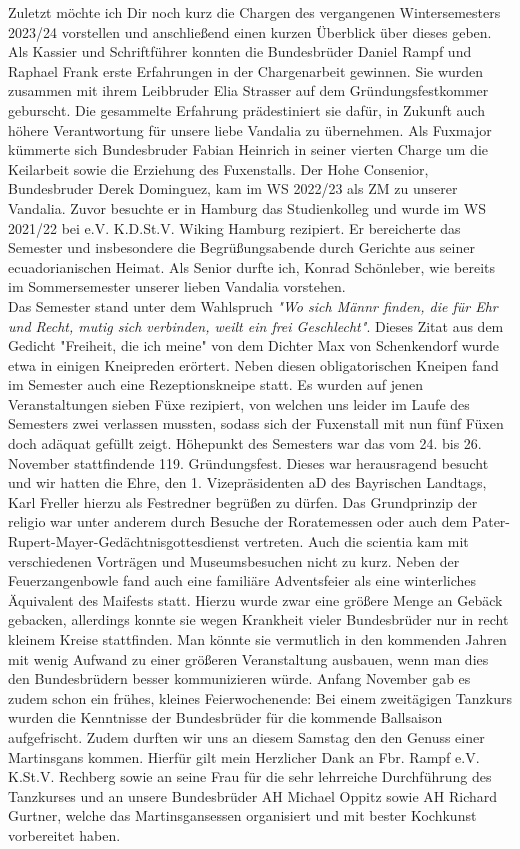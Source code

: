 \begin{multicols}{2}
Zuletzt möchte ich Dir noch kurz die Chargen des vergangenen Wintersemesters 2023/24 vorstellen und anschließend einen kurzen Überblick über dieses geben. Als Kassier und Schriftführer konnten die Bundesbrüder Daniel Rampf und Raphael Frank erste Erfahrungen in der Chargenarbeit gewinnen. Sie wurden zusammen mit ihrem Leibbruder Elia Strasser auf dem Gründungsfestkommer geburscht. Die gesammelte Erfahrung prädestiniert sie dafür, in Zukunft auch höhere Verantwortung für unsere liebe Vandalia zu übernehmen. Als Fuxmajor kümmerte sich Bundesbruder Fabian Heinrich in seiner vierten Charge um die Keilarbeit sowie die Erziehung des Fuxenstalls. Der Hohe Consenior, Bundesbruder Derek Dominguez, kam im WS 2022/23 als ZM zu unserer Vandalia. Zuvor besuchte er in Hamburg das Studienkolleg und wurde im WS 2021/22 bei e.V. K.D.St.V. Wiking Hamburg rezipiert. Er bereicherte das Semester und insbesondere die Begrüßungsabende durch Gerichte aus seiner ecuadorianischen Heimat. Als Senior durfte ich, Konrad Schönleber, wie bereits im Sommersemester unserer lieben Vandalia vorstehen.
\\
Das Semester stand unter dem Wahlspruch \textit{"Wo sich Männr finden, die für Ehr und Recht, mutig sich verbinden, weilt ein frei Geschlecht"}. Dieses Zitat aus dem Gedicht "Freiheit, die ich meine" von dem Dichter Max von Schenkendorf wurde etwa in einigen Kneipreden erörtert. Neben diesen obligatorischen Kneipen fand im Semester auch eine Rezeptionskneipe statt. Es wurden auf jenen Veranstaltungen sieben Füxe rezipiert, von welchen uns leider im Laufe des Semesters zwei verlassen mussten, sodass sich der Fuxenstall mit nun fünf Füxen doch adäquat gefüllt zeigt. Höhepunkt des Semesters war das vom 24. bis 26. November stattfindende 119. Gründungsfest. Dieses war herausragend besucht und wir hatten die Ehre, den 1. Vizepräsidenten aD des Bayrischen Landtags, Karl Freller hierzu als Festredner begrüßen zu dürfen. Das Grundprinzip der religio war unter anderem durch Besuche der Roratemessen oder auch dem Pater-Rupert-Mayer-Gedächtnisgottesdienst vertreten. Auch die scientia kam mit verschiedenen Vorträgen und Museumsbesuchen nicht zu kurz. Neben der Feuerzangenbowle fand auch eine familiäre Adventsfeier als eine winterliches Äquivalent des Maifests statt. Hierzu wurde zwar eine größere Menge an Gebäck gebacken, allerdings konnte sie wegen Krankheit vieler Bundesbrüder nur in recht kleinem Kreise stattfinden. Man könnte sie vermutlich in den kommenden Jahren mit wenig Aufwand zu einer größeren Veranstaltung ausbauen, wenn man dies den Bundesbrüdern besser kommunizieren würde. Anfang November gab es zudem schon ein frühes, kleines Feierwochenende: Bei einem zweitägigen Tanzkurs wurden die Kenntnisse der Bundesbrüder für die kommende Ballsaison aufgefrischt. Zudem durften wir uns an diesem Samstag den den Genuss einer Martinsgans kommen. Hierfür gilt mein Herzlicher Dank an Fbr. Rampf e.V. K.St.V. Rechberg sowie an seine Frau für die sehr lehrreiche Durchführung des Tanzkurses und an unsere Bundesbrüder AH Michael Oppitz sowie AH Richard Gurtner, welche das Martinsgansessen organisiert und mit bester Kochkunst vorbereitet haben.

\end{multicols}
